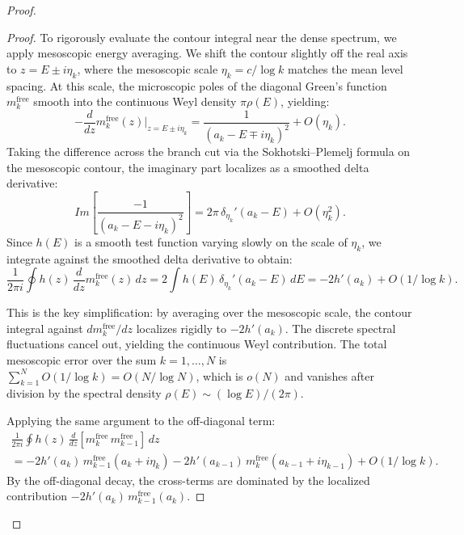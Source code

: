 \documentclass{pre-aomart}
\def\Im{Im}%
\theoremstyle{plain}
\theoremstyle{definition}
\theoremstyle{remark}
\begin{document}
\begin{proof}
\begin{proof}
To rigorously evaluate the contour integral near the dense spectrum, we apply
mesoscopic energy averaging. We shift the contour slightly off the real axis
to $z = E \pm i\eta_k$, where the mesoscopic scale $\eta_k = c/\log k$ matches the
mean level spacing. At this scale, the microscopic poles of the diagonal
Green's function $m_k^{\mathrm{free}}$ smooth into the continuous Weyl density
$\pi \rho(E)$, yielding:
\begin{equation}\label{eq:m_deriv_meso}
-\frac{d}{dz}m_k^{\mathrm{free}}(z)\Big|_{z=E \pm i\eta_k}
= \frac{1}{(a_k - E \mp i\eta_k)^2} + O(\eta_k).
\end{equation}
Taking the difference across the branch cut via the Sokhotski--Plemelj formula
on the mesoscopic contour, the imaginary part localizes as a smoothed delta derivative:
\begin{equation}\label{eq:im_m_deriv_meso}
\Im\!\left[\frac{-1}{(a_k - E - i\eta_k)^2}\right]
= 2\pi\,\delta_{\eta_k}'(a_k - E) + O(\eta_k^2).
\end{equation}
Since $h(E)$ is a smooth test function varying slowly on the scale of $\eta_k$,
we integrate against the smoothed delta derivative to obtain:
\begin{equation}\label{eq:single_site_meso}
\frac{1}{2\pi i}\oint h(z)\,\frac{d}{dz}m_k^{\mathrm{free}}(z)\,dz
= 2\int h(E)\,\delta_{\eta_k}'(a_k - E)\,dE = -2h'(a_k) + O(1/\log k).
\end{equation}

This is the key simplification: by averaging over the mesoscopic scale, the contour
integral against $dm_k^{\mathrm{free}}/dz$ localizes rigidly to $-2h'(a_k)$. The discrete
spectral fluctuations cancel out, yielding the continuous Weyl contribution.
The total mesoscopic error over the sum $k = 1, \ldots, N$ is
$\sum_{k=1}^{N} O(1/\log k) = O(N/\log N)$, which is $o(N)$ and
vanishes after division by the spectral density $\rho(E) \sim (\log E)/(2\pi)$.

Applying the same argument to the off-diagonal term:
\begin{multline}\label{eq:offdiag_contour}
\frac{1}{2\pi i}\oint h(z)\,\frac{d}{dz}[m_k^{\mathrm{free}}\,m_{k-1}^{\mathrm{free}}]\,dz\\
= -2h'(a_k)\,m_{k-1}^{\mathrm{free}}(a_k + i\eta_k)
  - 2h'(a_{k-1})\,m_k^{\mathrm{free}}(a_{k-1} + i\eta_{k-1}) + O(1/\log k).
\end{multline}
By the off-diagonal decay, the cross-terms are dominated by the localized contribution $-2h'(a_k)\,m_{k-1}^{\mathrm{free}}(a_k)$.


\end{proof}
\end{proof}
\end{document}

